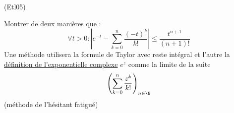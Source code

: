 \begin{tiny}(Etl05)\end{tiny} Montrer de deux manières que :
\begin{displaymath}
 \forall t>0 : \left|e^{-t} - \sum_{k=0}^n\frac{(-t)^k}{k!}\right|\leq\frac{t^{n+1}}{(n+1)!}
\end{displaymath}
Une méthode utilisera la formule de Taylor avec reste intégral et l'autre la \href{\baseurl temptex/fexvc.pdf}{définition de l'exponentielle complexe} $e^z$ comme la limite de la suite
\begin{displaymath}
 \left(\sum_{k=0}^n\frac{z^k}{k!} \right)_{n\in\N}
\end{displaymath}
(méthode de l'hésitant fatigué)